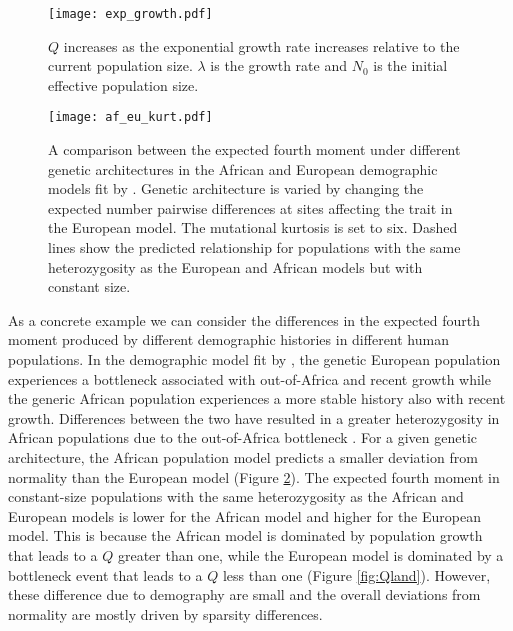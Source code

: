 \begin{figure}
\centering
\texttt{[image: exp\_growth.pdf]}
\caption{$Q$ increases as the exponential growth rate increases relative to the current
population size. $\lambda$ is the growth rate and $N_0$ is the initial effective population
size.}
\label{fig:Qexp}
\end{figure}

\begin{figure}
\centering
\texttt{[image: af\_eu\_kurt.pdf]}
\caption{A comparison between the expected fourth moment under different genetic
architectures in the African and European demographic models fit
by \citet{Tennessen2012}. Genetic architecture is varied by changing the
expected number pairwise differences at sites affecting the trait in the
European model. The mutational kurtosis is set to six. Dashed lines show the
predicted relationship for populations with the same heterozygosity as the
European and African models but with constant size.}
\label{fig:afeucomp}
\end{figure}

As a concrete example we can consider the differences in the expected fourth
moment produced by different demographic histories in different human
populations. In the demographic model fit by \citet{Tennessen2012}, the genetic
European population experiences a bottleneck associated with out-of-Africa and
recent growth while the generic African population experiences a more stable
history also with recent growth. Differences between the two have resulted in a
greater heterozygosity in African populations due to the out-of-Africa
bottleneck \citep{Yu2002}. For a given genetic architecture, the African
population model predicts a smaller deviation from normality than the European
model (Figure \ref{fig:afeucomp}). The expected fourth moment in constant-size
populations with the same heterozygosity as the African and European models is
lower for the African model and higher for the European model. This is because
the African model is dominated by population growth that leads to a $Q$ greater
than one, while the European model is dominated by a bottleneck event that leads
to a $Q$ less than one (Figure \ref{fig:Qland}). However, these difference due
to demography are small and the overall deviations from normality are mostly
driven by sparsity differences.

